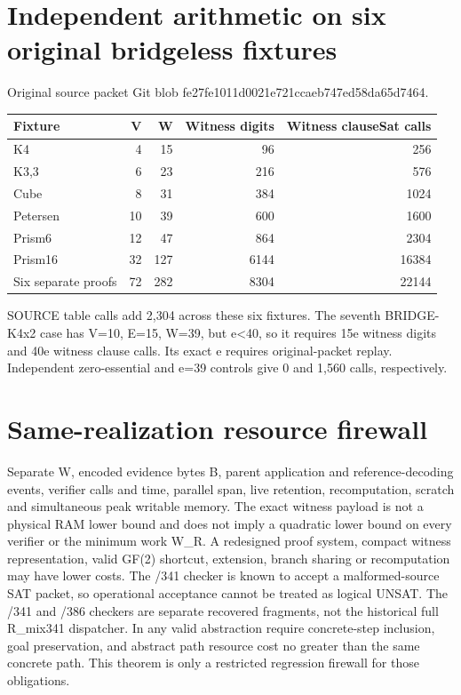\documentclass[11pt]{article}
\begin{document}
\section*{Independent arithmetic on six original bridgeless fixtures}
Original source packet Git blob fe27fe1011d0021e721ccaeb747ed58da65d7464.
\begin{center}\begin{tabular}{lrrrr}\toprule
Fixture & V & W & Witness digits & Witness clauseSat calls\\\midrule
K4&4&15&96&256\\
K3,3&6&23&216&576\\
Cube&8&31&384&1024\\
Petersen&10&39&600&1600\\
Prism6&12&47&864&2304\\
Prism16&32&127&6144&16384\\\midrule
Six separate proofs&72&282&8304&22144\\\bottomrule\end{tabular}\end{center}
SOURCE table calls add 2,304 across these six fixtures. The seventh BRIDGE-K4x2 case has V=10, E=15, W=39, but e<40, so it requires 15e witness digits and 40e witness clause calls. Its exact e requires original-packet replay. Independent zero-essential and e=39 controls give 0 and 1,560 calls, respectively.

\section*{Same-realization resource firewall}
Separate W, encoded evidence bytes B, parent application and reference-decoding events, verifier calls and time, parallel span, live retention, recomputation, scratch and simultaneous peak writable memory. The exact witness payload is not a physical RAM lower bound and does not imply a quadratic lower bound on every verifier or the minimum work W_R. A redesigned proof system, compact witness representation, valid GF(2) shortcut, extension, branch sharing or recomputation may have lower costs. The /341 checker is known to accept a malformed-source SAT packet, so operational acceptance cannot be treated as logical UNSAT. The /341 and /386 checkers are separate recovered fragments, not the historical full R_mix341 dispatcher. In any valid abstraction require concrete-step inclusion, goal preservation, and abstract path resource cost no greater than the same concrete path. This theorem is only a restricted regression firewall for those obligations.
\end{document}
